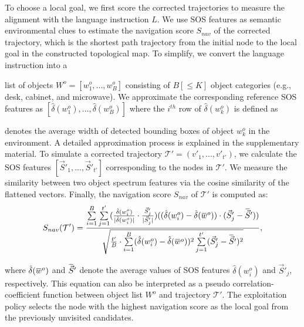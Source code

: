 \documentclass[10pt,twocolumn,letterpaper]{article}
\newcommand{\overbar}[1]{\mkern 1.5mu\overline{\mkern-1.5mu#1\mkern-1.5mu}\mkern 1.5mu}
\begin{document}
To choose a local goal, we first score the corrected trajectories to measure the alignment with the language instruction $L$. We use SOS features as semantic environmental clues to estimate the navigation score $S_{nav}$ of the corrected trajectory, which is the shortest path trajectory from the initial node to the local goal in the constructed topological map.\! To simplify, we convert the language instruction into a 

\noindent list of objects $W^o =[w^o_1, ..., w^o_B]$ consisting of $B [\leq K]$ object categories (e.g., desk, cabinet, and microwave). We approximate the corresponding reference SOS features as $[\hat\delta(w^o_1), ..., \hat\delta(w^o_B)]$ where the $i^{th}$ row of $\hat\delta(w^o_k)$ is defined as \font=2.5pt

\noindent denotes the average width of detected bounding boxes of object $w^o_k$ in the environment. A detailed approximation process is explained in the supplementary material. To simulate a corrected trajectory $\mathcal{T}'=(v'_1, ..., v'_{t'})$, we calculate the SOS features $[\vec{S}'_1, ..., \vec{S}'_{t'}]$ corresponding to the nodes in $\mathcal{T}'$. We measure the similarity between two object spectrum features via the cosine similarity of the flattened vectors. Finally, the navigation score $S_{nav}$ of $\mathcal{T}'$ is computed as:
{\footnotesize
\begin{align}\label{sos}
    \begin{split}
        S_{nav}(\mathcal{T}') = {{\sum\limits_{i=1}^{B}\sum\limits_{j=1}^{t'} ({\hat\delta(w^o_i)\over{|\hat\delta(w^o_i)|}}\cdot {\vec{S}'_j\over{|\vec{S}'_j|}})((\hat\delta(w^o_i)-\hat\delta(\overbar{w}^o))\cdot(\vec{S}'_j-\overbar{\vec{S}}'))}\over{\sqrt{{{t'}\over B}\cdot\sum\limits_{i=1}^{B} (\hat\delta(w^o_i)-\hat\delta(\overbar{w}^o))^2\sum\limits_{j=1}^{t'} (\vec{S}'_j-\overbar{\vec{S}}')^2}}},
    \end{split}
\end{align}
}\vspace{-0.4cm}

\noindent where $\hat\delta(\overbar{w}^o)$ and $\overbar{\vec{S}}'$ denote the average values of SOS features $\hat\delta({w}^o_i)$ and $\vec{S}'_j$, respectively. This equation can also be interpreted as a pseudo correlation-coefficient function between object list $W^o$ and trajectory $\mathcal{T}'$.
The exploitation policy selects the node with the highest navigation score as the local goal from the previously unvisited candidates.
\end{document}
